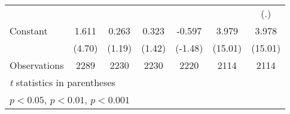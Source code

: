 \begin{table}[htbp]
\begin{tabular}{l*{6}{c}}
                    &                     &                     &                     &                     &                     &         (.)         \\
[1em]
Constant            &       1.611\sym{***}&       0.263         &       0.323         &      -0.597         &       3.979\sym{***}&       3.978\sym{***}\\
                    &      (4.70)         &      (1.19)         &      (1.42)         &     (-1.48)         &     (15.01)         &     (15.01)         \\
\hline
Observations        &        2289         &        2230         &        2230         &        2220         &        2114         &        2114         \\
\hline\hline
\multicolumn{7}{l}{\footnotesize \textit{t} statistics in parentheses}\\
\multicolumn{7}{l}{\footnotesize \sym{*} \(p<0.05\), \sym{**} \(p<0.01\), \sym{***} \(p<0.001\)}\\
\end{tabular}
\end{table}
